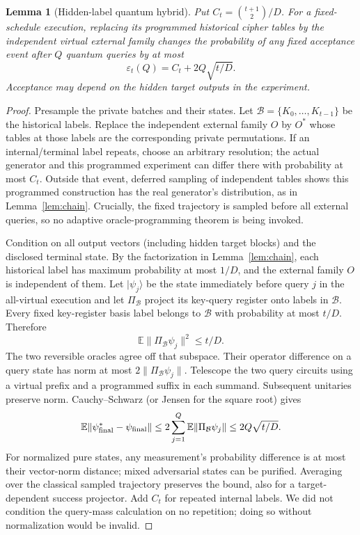 \documentclass[11 pt,a 4 paper]{article}
\newtheorem{lemma}[theorem]{Lemma}
\begin{document}
\begin{lemma}[Hidden-label quantum hybrid]\label{lem:qhybrid}
Put $ C_t=\binom{t+1}{2}/D $. For a fixed-schedule execution, replacing its programmed historical cipher tables by the independent virtual external family changes the probability of any fixed acceptance event after $ Q $ quantum queries by at most
\begin{equation}
 \varepsilon_t(Q)=C_t+2 Q\sqrt{t/D}.\label{eq:qhybrid}
\end{equation}
Acceptance may depend on the hidden target outputs in the experiment.
\end{lemma}
\begin{proof}
Presample the private batches and their states. Let $\mathcal B=\{K_0,\ldots,K_{t-1}\}$ be the historical labels. Replace the independent external family $ O $ by $ O^*$ whose tables at those labels are the corresponding private permutations. If an internal/terminal label repeats, choose an arbitrary resolution; the actual generator and this programmed experiment can differ there with probability at most $ C_t $. Outside that event, deferred sampling of independent tables shows this programmed construction has the real generator's distribution, as in Lemma~\ref{lem:chain}. Crucially, the fixed trajectory is sampled before all external queries, so no adaptive oracle-programming theorem is being invoked.

Condition on all output vectors (including hidden target blocks) and the disclosed terminal state. By the factorization in Lemma~\ref{lem:chain}, each historical label has maximum probability at most $1/D $, and the external family $ O $ is independent of them. Let $|\psi_j\rangle $ be the state immediately before query $ j $ in the all-virtual execution and let $\Pi_{\mathcal B}$ project its key-query register onto labels in $\mathcal B $. Every fixed key-register basis label belongs to $\mathcal B $ with probability at most $ t/D $. Therefore
\[
 \mathbb E\|\Pi_{\mathcal B}\psi_j\|^2\leq t/D.
\]
The two reversible oracles agree off that subspace. Their operator difference on a query state has norm at most $2\|\Pi_{\mathcal B}\psi_j\|$. Telescope the two query circuits using a virtual prefix and a programmed suffix in each summand. Subsequent unitaries preserve norm. Cauchy--Schwarz (or Jensen for the square root) gives
\[
 \mathbb E\|\psi^{*}_{\rm final}-\psi_{\rm final}\|
 \leq 2\sum_{j=1}^Q\mathbb E\|\Pi_{\mathcal B}\psi_j\|
 \leq 2 Q\sqrt{t/D}.
\]
For normalized pure states, any measurement's probability difference is at most their vector-norm distance; mixed adversarial states can be purified. Averaging over the classical sampled trajectory preserves the bound, also for a target-dependent success projector. Add $ C_t $ for repeated internal labels. We did not condition the query-mass calculation on no repetition; doing so without normalization would be invalid.
\end{proof}
\end{document}
